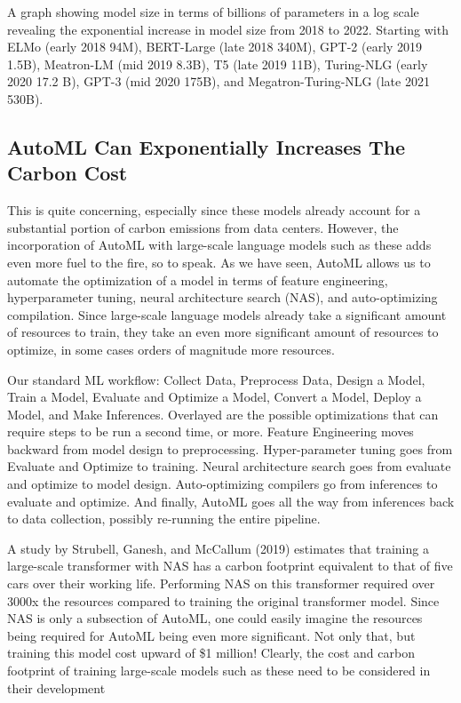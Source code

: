 {{{{ 
    
    
    A graph showing model size in terms of billions of parameters in a log scale revealing the exponential increase in model size from 2018 to 2022. Starting with ELMo (early 2018 94M), BERT-Large (late 2018 340M), GPT-2 (early 2019 1.5B), Meatron-LM (mid 2019 8.3B), T5 (late 2019 11B), Turing-NLG (early 2020 17.2 B), GPT-3 (mid 2020 175B), and Megatron-Turing-NLG (late 2021 530B).
    
    \subsection{AutoML Can Exponentially Increases The Carbon Cost}
    
    This is quite concerning, especially since these models already account for a substantial portion of carbon emissions from data centers. However, the incorporation of AutoML with large-scale language models such as these adds even more fuel to the fire, so to speak. As we have seen,  AutoML allows us to automate the optimization of a model in terms of feature engineering, hyperparameter tuning, neural architecture search (NAS), and auto-optimizing compilation. Since large-scale language models already take a significant amount of resources to train, they take an even more significant amount of resources to optimize, in some cases orders of magnitude more resources.
    
    
    Our standard ML workflow: Collect Data, Preprocess Data, Design a Model, Train a Model, Evaluate and Optimize a Model, Convert a Model, Deploy a Model, and Make Inferences. Overlayed are the possible optimizations that can require steps to be run a second time, or more. Feature Engineering moves backward from model design to preprocessing. Hyper-parameter tuning goes from Evaluate and Optimize to training. Neural architecture search goes from evaluate and optimize to model design. Auto-optimizing compilers go from inferences to evaluate and optimize. And finally, AutoML goes all the way from inferences back to data collection, possibly re-running the entire pipeline.
    
    A study by Strubell, Ganesh, and McCallum (2019) estimates that training a large-scale transformer with NAS has a carbon footprint equivalent to that of five cars over their working life. Performing NAS on this transformer required over 3000x the resources compared to training the original transformer model. Since NAS is only a subsection of AutoML, one could easily imagine the resources being required for AutoML being even more significant. Not only that, but training this model cost upward of \$1 million! Clearly, the cost and carbon footprint of training large-scale models such as these need to be considered in their development
    
}}}}
